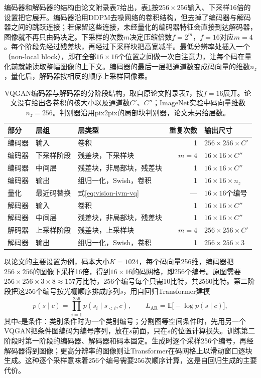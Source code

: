 编码器和解码器的结构由论文附录表7给出，表\ref{tab:vision-ivm-vqgan-layers}按$256\times256$输入、下采样16倍的设置把它展开。编码器沿用DDPM去噪网络的卷积结构，但去掉了编码器与解码器之间的跳跃连接；若保留这些连接，未经量化的编码器特征会直接到达解码器，图像就不再只由码决定。下采样的次数$m$决定压缩倍数$f=2^m$，$f=16$对应$m=4$。每个阶段先经过残差块，再经过下采样块把高宽减半。最低分辨率处插入一个（non-local block），即在全部$16\times16$个位置之间做一次自注意力，让每个码在量化前就能读取整幅图像的上下文。编码器的最后一层把通道数变成码向量的维数$n_z$，量化后，解码器按相反的顺序上采样回像素。

\begin{table}[tbp]
  \centering
  \small
  \begin{tabular}{@{}lllrl@{}}
    \toprule
    部分 & 层组 & 层类型 & 重复次数 & 输出尺寸\\
    \midrule
    编码器 & 输入 & 卷积 & 1 & $256\times256\times C'$\\
    编码器 & 下采样阶段 & 残差块，下采样块 & $m=4$ & $16\times16\times C''$\\
    编码器 & 中间层 & 残差块，非局部块，残差块 & 1 & $16\times16\times C''$\\
    编码器 & 输出 & 组归一化，Swish，卷积 & 1 & $16\times16\times n_z$\\
    量化 & 最近码替换 & 式\eqref{eq:vision-ivm-vq} & — & $16\times16$个编号\\
    解码器 & 输入 & 卷积 & 1 & $16\times16\times C''$\\
    解码器 & 中间层 & 残差块，非局部块，残差块 & 1 & $16\times16\times C''$\\
    解码器 & 上采样阶段 & 残差块，上采样块 & $m=4$ & $256\times256\times C'$\\
    解码器 & 输出 & 组归一化，Swish，卷积 & 1 & $256\times256\times3$\\
    \bottomrule
  \end{tabular}
  \caption{VQGAN编码器与解码器的分阶段结构，取自原论文附录表7，按$f=16$展开。论文没有给出各卷积的核大小以及通道数$C'$、$C''$；ImageNet实验中码向量维数$n_z=256$。判别器沿用pix2pix的局部块判别器，论文未另给层数。}
  \label{tab:vision-ivm-vqgan-layers}
\end{table}

以论文的主要设置为例，码本大小$K=1024$，每个码向量256维，编码器把$256\times256$的图像下采样16倍，得到$16\times16$的码网格，即256个编号。原图需要$256\times256\times3\times8\approx157$万比特，256个编号每个只需10比特，共2560比特。第二阶段把这256个编号按光栅顺序排成序列$s$，用自回归Transformer建模
\begin{equation}
  p(s\mid c)=\prod_{i=1}^{256}p(s_i\mid s_{<i},c),
  \qquad L_{\mathrm{AR}}=\mathbb E\bigl[-\log p(s\mid c)\bigr],
  \label{eq:vision-ivm-vqgan-ar}
\end{equation}
其中$c$是条件：类别条件时为一个类别编号；分割图等空间条件时，先用另一个VQGAN把条件图编码为编号序列，放在$s$前面，只在$s$的位置计算损失。训练第二阶段时第一阶段的编码器、解码器和码本固定。生成时逐个采样256个编号，再经解码器得到图像；更高分辨率的图像则让Transformer在码网格上以滑动窗口逐块生成。这种逐个采样意味着256个编号需要256次顺序计算，这是自回归生成的主要代价。

